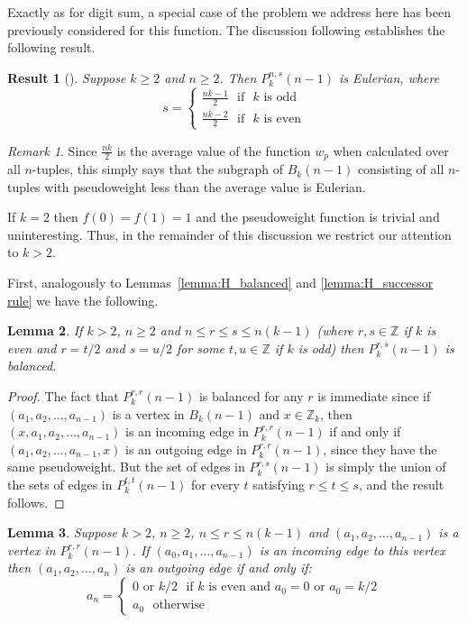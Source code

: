 \documentclass[a4paper,11pt]{article}
\theoremstyle{plain}
\newtheorem{lemma}{Lemma}[section]
\newtheorem{result}[lemma]{Result}
\theoremstyle{definition}
\theoremstyle{remark}
\newtheorem{remark}{Remark}[section]
\begin{document}
Exactly as for digit sum, a special case of the problem we address here has been previously
considered for this function. The discussion following \cite[Theorem 3.8]{Mitchell25a} establishes
the following result.

\begin{result}[\cite{Mitchell25a}]  \label{result:old_P_lemma}
Suppose $k\geq2$ and $n\geq 2$. Then $P_k^{n,s}(n-1)$ is Eulerian, where
\[ s = \begin{cases}
\frac{nk-1}{2}\text{~~if~~$k$ is odd}\\
\frac{nk-2}{2}\text{~~if~~$k$ is even}
\end{cases}\]
\end{result}

\begin{remark}
Since $\frac{nk}{2}$ is the average value of the function $w_p$ when calculated over all
$n$-tuples, this simply says that the subgraph of $B_k(n-1)$ consisting of all $n$-tuples with
pseudoweight less than the average value is Eulerian.
\end{remark}

If $k=2$ then $f(0)=f(1)=1$ and the pseudoweight function is trivial and uninteresting. Thus, in
the remainder of this discussion we restrict our attention to $k>2$.

First, analogously to Lemmas~\ref{lemma:H_balanced} and \ref{lemma:H_successor rule} we have the
following.

\begin{lemma}  \label{lemma:P_balanced}
If $k>2$, $n\geq 2$ and $n\leq r\leq s\leq n(k-1)$ (where $r,s\in\mathbb{Z}$ if $k$ is even and
$r=t/2$ and $s=u/2$ for some $t,u\in\mathbb{Z}$ if $k$ is odd) then $P_k^{r,s}(n-1)$ is balanced.
\end{lemma}

\begin{proof}
The fact that $P_k^{r,r}(n-1)$ is balanced for any $r$ is immediate since if
$(a_1,a_2,\dots,a_{n-1})$ is a vertex in $B_k(n-1)$ and $x\in \mathbb{Z}_k$, then
$(x,a_1,a_2,\dots,a_{n-1})$ is an incoming edge in $P_k^{r,r}(n-1)$ if and only if
$(a_1,a_2,\dots,a_{n-1},x)$ is an outgoing edge in $P_k^{r,r}(n-1)$, since they have the same
pseudoweight. But the set of edges in $P_k^{r,s}(n-1)$ is simply the union of the sets of edges in
$P_k^{t,t}(n-1)$ for every $t$ satisfying $r\leq t\leq s$, and the result follows.
\end{proof}

\begin{lemma}  \label{lemma:P_successor rule}
Suppose $k>2$, $n\geq 2$, $n\leq r\leq n(k-1)$ and $(a_1,a_2,\dots,a_{n-1})$ is a vertex in
$P_k^{r,r}(n-1)$.  If $(a_0,a_1,\dots,a_{n-1})$ is an incoming edge to this vertex then
$(a_1,a_2,\dots,a_{n})$ is an outgoing edge if and only if:
\[ a_n=\begin{cases}
0 \text{~or~} k/2 \text{~~if $k$ is even and $a_0=0$ or $a_0=k/2$}\\
a_0               \text{~~otherwise}
\end{cases} \]
\end{lemma}
\end{document}
